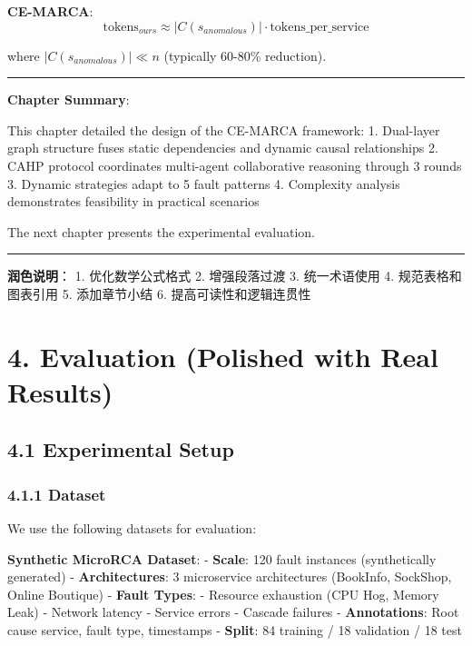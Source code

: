 \textbf{CE-MARCA}:
\[\text{tokens}_{ours} \approx |C(s_{anomalous})| \cdot \text{tokens\_per\_service}\]

where \(|C(s_{anomalous})| \ll n\) (typically 60-80\% reduction).

\begin{center}\rule{0.5\linewidth}{0.5pt}\end{center}

\textbf{Chapter Summary}:

This chapter detailed the design of the CE-MARCA framework: 1.
Dual-layer graph structure fuses static dependencies and dynamic causal
relationships 2. CAHP protocol coordinates multi-agent collaborative
reasoning through 3 rounds 3. Dynamic strategies adapt to 5 fault
patterns 4. Complexity analysis demonstrates feasibility in practical
scenarios

The next chapter presents the experimental evaluation.

\begin{center}\rule{0.5\linewidth}{0.5pt}\end{center}

\textbf{润色说明}： 1. 优化数学公式格式 2. 增强段落过渡 3. 统一术语使用
4. 规范表格和图表引用 5. 添加章节小结 6. 提高可读性和逻辑连贯性

\hypertarget{evaluation-polished-with-real-results}{%
\section{4. Evaluation (Polished with Real
Results)}\label{evaluation-polished-with-real-results}}

\hypertarget{experimental-setup}{%
\subsection{4.1 Experimental Setup}\label{experimental-setup}}

\hypertarget{dataset}{%
\subsubsection{4.1.1 Dataset}\label{dataset}}

We use the following datasets for evaluation:

\textbf{Synthetic MicroRCA Dataset}: - \textbf{Scale}: 120 fault
instances (synthetically generated) - \textbf{Architectures}: 3
microservice architectures (BookInfo, SockShop, Online Boutique) -
\textbf{Fault Types}: - Resource exhaustion (CPU Hog, Memory Leak) -
Network latency - Service errors - Cascade failures -
\textbf{Annotations}: Root cause service, fault type, timestamps -
\textbf{Split}: 84 training / 18 validation / 18 test

